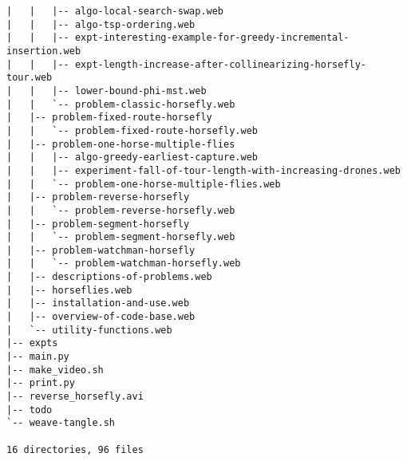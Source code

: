 \begin{verbatim}
|   |   |-- algo-local-search-swap.web
|   |   |-- algo-tsp-ordering.web
|   |   |-- expt-interesting-example-for-greedy-incremental-insertion.web
|   |   |-- expt-length-increase-after-collinearizing-horsefly-tour.web
|   |   |-- lower-bound-phi-mst.web
|   |   `-- problem-classic-horsefly.web
|   |-- problem-fixed-route-horsefly
|   |   `-- problem-fixed-route-horsefly.web
|   |-- problem-one-horse-multiple-flies
|   |   |-- algo-greedy-earliest-capture.web
|   |   |-- experiment-fall-of-tour-length-with-increasing-drones.web
|   |   `-- problem-one-horse-multiple-flies.web
|   |-- problem-reverse-horsefly
|   |   `-- problem-reverse-horsefly.web
|   |-- problem-segment-horsefly
|   |   `-- problem-segment-horsefly.web
|   |-- problem-watchman-horsefly
|   |   `-- problem-watchman-horsefly.web
|   |-- descriptions-of-problems.web
|   |-- horseflies.web
|   |-- installation-and-use.web
|   |-- overview-of-code-base.web
|   `-- utility-functions.web
|-- expts
|-- main.py
|-- make_video.sh
|-- print.py
|-- reverse_horsefly.avi
|-- todo
`-- weave-tangle.sh

16 directories, 96 files
\end{verbatim}
